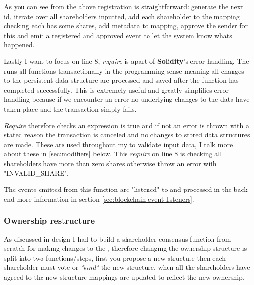 As you can see from the above registration is straightforward: generate the next id, iterate over all shareholders inputted, add each shareholder to the mapping checking each has some shares, add metadata to mapping, approve the sender for this  and emit a registered and approved event to let the system know whats happened.

Lastly I want to focus on line 8, \textit{require} is apart of \textbf{Solidity}'s error handling. The  runs all functions transactionally in the programming sense meaning all changes to the persistent data structure are processed and saved after the function has completed successfully. This is extremely useful and greatly simplifies error handling because if we encounter an error no underlying changes to the data have taken place and the transaction simply fails. 

\textit{Require} therefore checks an expression is true and if not an error is thrown with a stated reason the transaction is canceled and no changes to stored data structures are made. These are used throughout my  to validate input data, I talk more about these in \ref{sec:modifiers} below. This \textit{require} on line 8 is checking all shareholders have more than zero shares otherwise throw an error with "INVALID\_SHARE".

The events emitted from this function are "listened" to and processed in the back-end more information in section \ref{sec:blockchain-event-listeners}.

\subsubsection{Ownership restructure}

As discussed in  design I had to build a shareholder consensus function from scratch for making changes to the , therefore changing the ownership structure is split into two functions/steps, first you propose a new structure then each shareholder must vote or \textit{"bind"} the new structure, when all the shareholders have agreed to the new structure mappings are updated to reflect the new ownership.

